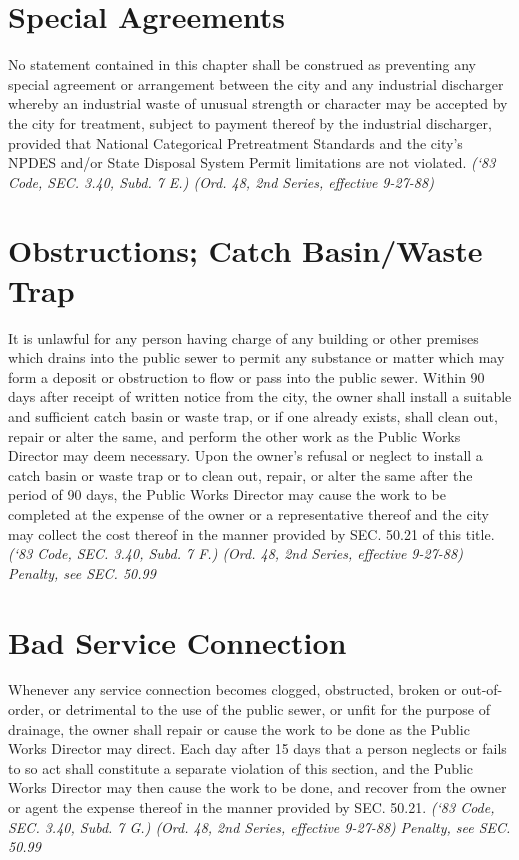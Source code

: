 \documentclass[code.tex]{subfiles}
\begin{document}
\section{Special Agreements}
No statement contained in this chapter shall be construed as preventing any special agreement or arrangement between the city and any industrial discharger whereby an industrial waste of unusual strength or character may be accepted by the city for treatment, subject to payment thereof by the industrial discharger, provided that National Categorical Pretreatment Standards and the city’s NPDES and/or State Disposal System Permit limitations are not violated.\newline
\emph{(‘83 Code, SEC. 3.40, Subd. 7 E.) (Ord. 48, 2nd Series, effective 9-27-88)}
\section{Obstructions; Catch Basin/Waste Trap}
It is unlawful for any person having charge of any building or other premises which drains into the public sewer to permit any substance or matter which may form a deposit or obstruction to flow or pass into the public sewer.  Within 90 days after receipt of written notice from the city, the owner shall install a suitable and sufficient catch basin or waste trap, or if one already exists, shall clean out, repair or alter the same, and perform the other work as the Public Works Director may deem necessary.  Upon the owner’s refusal or neglect to install a catch basin or waste trap or to clean out, repair, or alter the same after the period of 90 days, the Public Works Director may cause the work to be completed at the expense of the owner or a representative thereof and the city may collect the cost thereof in the manner provided by SEC. 50.21 of this title.\newline
\emph{(‘83 Code, SEC. 3.40, Subd. 7 F.) (Ord. 48, 2nd Series, effective 9-27-88)}\newline
\emph{Penalty, see SEC. 50.99}
\section{Bad Service Connection}
Whenever any service connection becomes clogged, obstructed, broken or out-of-order, or detrimental to the use of the public sewer, or unfit for the purpose of drainage, the owner shall repair or cause the work to be done as the Public Works Director may direct.  Each day after 15 days that a person neglects or fails to so act shall constitute a separate violation of this section, and the Public Works Director may then cause the work to be done, and recover from the owner or agent the expense thereof in the manner provided by SEC. 50.21.\newline
\emph{(‘83 Code, SEC. 3.40, Subd. 7 G.) (Ord. 48, 2nd Series, effective 9-27-88)}\newline
\emph{Penalty, see SEC. 50.99}
\end{document}
